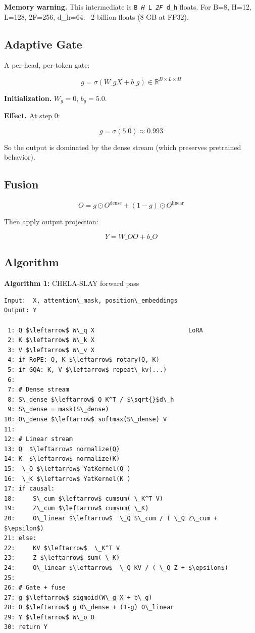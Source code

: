 \textbf{Memory warning.} This intermediate is \texttt{B \textit{ H } L \textit{ 2F } d\_h} floats. 
For B=8, H=12, L=128, 2F=256, d\_h=64: ~2 billion floats (8 GB at FP32).

\subsection{Adaptive Gate}

A per-head, per-token gate:

\[
g = \sigma(W\_g X + b\_g) \in \mathbb{R}^{B \times L \times H}
\]

\textbf{Initialization.} $W_g = 0$, $b_g = 5.0$.

\textbf{Effect.} At step 0:

\[
g = \sigma(5.0) \approx 0.993
\]

So the output is dominated by the dense stream (which preserves pretrained 
behavior).

\subsection{Fusion}

\[
O = g \odot O^\text{dense} + (1 - g) \odot O^\text{linear}
\]

Then apply output projection:

\[
Y = W\_O O + b\_O
\]

\subsection{Algorithm}

\textbf{Algorithm 1:} CHELA-SLAY forward pass
\begin{lstlisting}
Input:  X, attention\_mask, position\_embeddings
Output: Y

 1: Q $\leftarrow$ W\_q X                          LoRA
 2: K $\leftarrow$ W\_k X
 3: V $\leftarrow$ W\_v X
 4: if RoPE: Q, K $\leftarrow$ rotary(Q, K)
 5: if GQA: K, V $\leftarrow$ repeat\_kv(...)
 6:
 7: # Dense stream
 8: S\_dense $\leftarrow$ Q K^T / $\sqrt{}$d\_h
 9: S\_dense = mask(S\_dense)
10: O\_dense $\leftarrow$ softmax(S\_dense) V
11:
12: # Linear stream
13: Q  $\leftarrow$ normalize(Q)
14: K  $\leftarrow$ normalize(K)
15:  \_Q $\leftarrow$ YatKernel(Q )
16:  \_K $\leftarrow$ YatKernel(K )
17: if causal:
18:     S\_cum $\leftarrow$ cumsum( \_K^T V)
19:     Z\_cum $\leftarrow$ cumsum( \_K)
20:     O\_linear $\leftarrow$  \_Q S\_cum / ( \_Q Z\_cum + $\epsilon$)
21: else:
22:     KV $\leftarrow$  \_K^T V
23:     Z $\leftarrow$ sum( \_K)
24:     O\_linear $\leftarrow$  \_Q KV / ( \_Q Z + $\epsilon$)
25:
26: # Gate + fuse
27: g $\leftarrow$ sigmoid(W\_g X + b\_g)
28: O $\leftarrow$ g O\_dense + (1-g) O\_linear
29: Y $\leftarrow$ W\_o O
30: return Y
\end{lstlisting}

